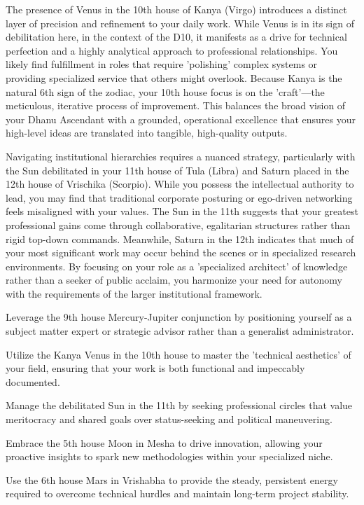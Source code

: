 {\fontsize{9}{13}\selectfont The presence of Venus in the 10th house of Kanya (Virgo) introduces a distinct layer of precision and refinement to your daily work. While Venus is in its sign of debilitation here, in the context of the D10, it manifests as a drive for technical perfection and a highly analytical approach to professional relationships. You likely find fulfillment in roles that require 'polishing' complex systems or providing specialized service that others might overlook. Because Kanya is the natural 6th sign of the zodiac, your 10th house focus is on the 'craft'---the meticulous, iterative process of improvement. This balances the broad vision of your Dhanu Ascendant with a grounded, operational excellence that ensures your high-level ideas are translated into tangible, high-quality outputs.}\par\vspace{1.8mm}

{\fontsize{9}{13}\selectfont Navigating institutional hierarchies requires a nuanced strategy, particularly with the Sun debilitated in your 11th house of Tula (Libra) and Saturn placed in the 12th house of Vrischika (Scorpio). While you possess the intellectual authority to lead, you may find that traditional corporate posturing or ego-driven networking feels misaligned with your values. The Sun in the 11th suggests that your greatest professional gains come through collaborative, egalitarian structures rather than rigid top-down commands. Meanwhile, Saturn in the 12th indicates that much of your most significant work may occur behind the scenes or in specialized research environments. By focusing on your role as a 'specialized architect' of knowledge rather than a seeker of public acclaim, you harmonize your need for autonomy with the requirements of the larger institutional framework.}\par\vspace{1.8mm}

\begin{diamondlist}
  \item {\fontsize{8.5}{12}\selectfont Leverage the 9th house Mercury-Jupiter conjunction by positioning yourself as a subject matter expert or strategic advisor rather than a generalist administrator.}
  \item {\fontsize{8.5}{12}\selectfont Utilize the Kanya Venus in the 10th house to master the 'technical aesthetics' of your field, ensuring that your work is both functional and impeccably documented.}
  \item {\fontsize{8.5}{12}\selectfont Manage the debilitated Sun in the 11th by seeking professional circles that value meritocracy and shared goals over status-seeking and political maneuvering.}
  \item {\fontsize{8.5}{12}\selectfont Embrace the 5th house Moon in Mesha to drive innovation, allowing your proactive insights to spark new methodologies within your specialized niche.}
  \item {\fontsize{8.5}{12}\selectfont Use the 6th house Mars in Vrishabha to provide the steady, persistent energy required to overcome technical hurdles and maintain long-term project stability.}
\end{diamondlist}

